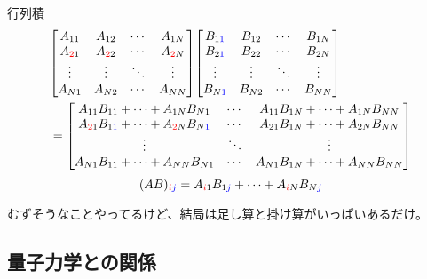 \documentclass[dvipdfm]{beamer}
\begin{document}
\begin{frame}{行列積}
    \begin{equation*}
        \begin{split}
            &
            \mqty[
                A_{11} & A_{12} & \cdots & A_{1N}
                \\
                A_{\red{2}1} & A_{\red{2}2} & \cdots & A_{\red{2}N}
                \\
                \vdots & \vdots & \ddots & \vdots
                \\
                A_{N1} & A_{N2} & \cdots & A_{NN}
            ]
            \mqty[
                B_{1\blue{1}} & B_{12} & \cdots & B_{1N}
                \\
                B_{2\blue{1}} & B_{22} & \cdots & B_{2N}
                \\
                \vdots & \vdots & \ddots & \vdots
                \\
                B_{N\blue{1}} & B_{N2} & \cdots & B_{NN}
            ]
            \\
            &=
            \mqty[
                A_{11}B_{11}+\cdots+A_{1N}B_{N1} & \cdots & A_{11}B_{1N}+\cdots+A_{1N}B_{NN}
                \\
                A_{\red{2}1}B_{1\blue{1}}+\cdots+A_{\red{2}N}B_{N\blue{1}} & \cdots & A_{21}B_{1N}+\cdots+A_{2N}B_{NN}
                \\
                \vdots & \ddots & \vdots
                \\
                A_{N1}B_{11}+\cdots+A_{NN}B_{N1} & \cdots & A_{N1}B_{1N}+\cdots+A_{NN}B_{NN}
            ]
        \end{split}
    \end{equation*}
    \begin{equation*}
        (AB)_{\textcolor{red}{i}\textcolor{blue}{j}}
        =
        A_{\textcolor{red}{i}1}B_{1\textcolor{blue}{j}}+\cdots+A_{\textcolor{red}{i}N}B_{N\textcolor{blue}{j}}
    \end{equation*}

    むずそうなことやってるけど、結局は足し算と掛け算がいっぱいあるだけ。
\end{frame}


\subsection{量子力学との関係}
\end{document}
